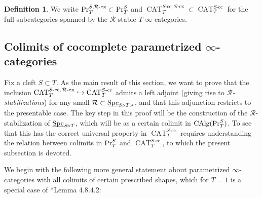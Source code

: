 \documentclass[reqno]{memo-l}
\theoremstyle{mythm}
\theoremstyle{definition}
\newtheorem{definition}[thm]{Definition}
\numberwithin{equation}{section}
\newcommand{\Rr}{{\mathcal R}}
\DeclareMathOperator{\Spc}{Spc}
\DeclareMathOperator{\CAT}{CAT}
\DeclareMathOperator{\CAlg}{\textup{CAlg}}
\renewcommand{\Pr}{\textup{Pr}}
\newcommand{\ulhelper}[2]{\underline{\setbox0=\hbox{$#1#2$}\dp0=0.4pt \box0\relax}}
\newcommand{\ul}[1]{{\mathpalette\ulhelper{#1}}\hbox{\rule[-2pt]{0pt}{0pt}}}
\begin{document}
\begin{definition}
    We write $\Pr^{S,\Rr\text{-ex}}_T\subset\Pr^S_T$ and $\CAT_T^{\text{$S$-cc},\Rr\text{-ex}}\subset\CAT_T^\text{$S$-cc}$ for the full subcategories spanned by the $\mathcal R$-stable $T$-$\infty$-categories.
\end{definition}

\subsection{Colimits of cocomplete parametrized $\bm\infty$-categories} Fix a cleft $S\subset T$. As the main result of this section, we want to prove that the inclusion $\CAT_T^\text{$S$-cc,\,$\Rr$-ex}\hookrightarrow\CAT_T^\text{$S$-cc}$ admits a left adjoint (giving rise to \emph{$\Rr$-stabilizations}) for any small $\Rr\subset\ul\Spc_{S\triangleright T,*}$, and that this adjunction restricts to the presentable case. The key step in this proof will be the construction of the $\Rr$-stabilization of $\ul\Spc_{S\triangleright T}$, which will be as a certain colimit in $\CAlg(\Pr^S_T)$. To see that this has the correct universal property in $\CAT_T^\text{$S$-cc}$ requires understanding the relation between colimits in $\Pr^S_T$ and $\CAT_T^\text{$S$-cc}$, to which the present subsection is devoted.

We begin with the following more general statement about parametrized $\infty$-categories with all colimits of certain prescribed shapes, which for $T=1$ is a special case of \cite{HA}*{Lemma 4.8.4.2}:
\end{document}
